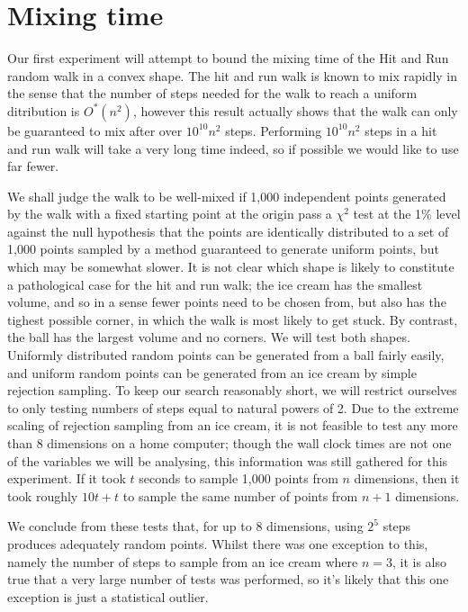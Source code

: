 \section{Mixing time}\label{sec_mix}

Our first experiment will attempt to bound the mixing time of the Hit and Run random walk in a convex shape. The hit and run walk is known to mix rapidly %
in the sense that the number of steps needed for the walk to reach a uniform ditribution is $O^{*}(n^2)$, however this result actually shows that the walk can only be guaranteed to mix after over $10^{10} n^2$ steps. Performing $10^{10} n^2$ steps in a hit and run walk will take a very long time indeed, so if possible we would like to use far fewer.

We shall judge the walk to be well-mixed if 1,000 independent points generated by the walk with a fixed starting point at the origin pass a $\chi^2$ test at the 1\% level against the null hypothesis that the points are identically distributed to a set of 1,000 points sampled by a method guaranteed to generate uniform points, but which may be somewhat slower. It is not clear which shape is likely to constitute a pathological case for the hit and run walk; the ice cream has the smallest volume, and so in a sense fewer points need to be chosen from, but also has the tighest possible corner, in which the walk is most likely to get stuck. By contrast, the ball has the largest volume and no corners. We will test both shapes. Uniformly distributed random points can be generated from a ball fairly easily, and uniform random points can be generated from an ice cream by simple rejection sampling. To keep our search reasonably short, we will restrict ourselves to only testing numbers of steps equal to natural powers of 2. Due to the extreme scaling of rejection sampling from an ice cream, it is not feasible to test any more than 8 dimensions on a home computer; though the wall clock times are not one of the variables we will be analysing, this information was still gathered for this experiment. If it took $t$ seconds to sample 1,000 points from $n$ dimensions, then it took roughly $10t+t$ to sample the same number of points from $n+1$ dimensions.


We conclude from these tests that, for up to 8 dimensions, using $2^5$ steps produces adequately random points. Whilst there was one exception to this, namely the number of steps to sample from an ice cream where $n=3$, it is also true that a very large number of tests was performed, so it's likely that this one exception is just a statistical outlier.

